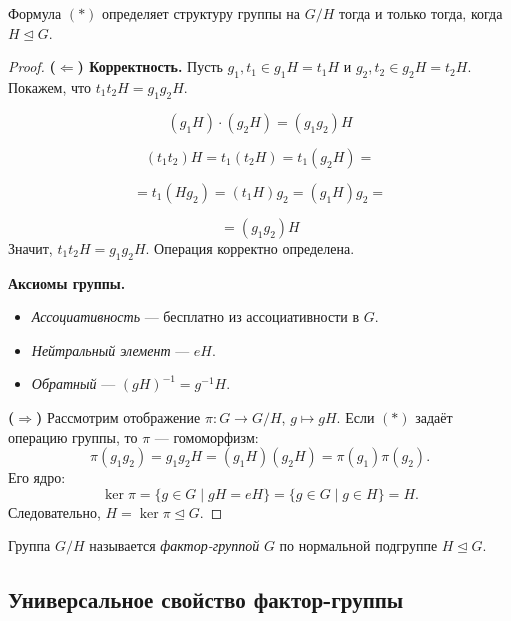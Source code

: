 \begin{stmt}
    Формула $(*)$ определяет структуру группы на $G/H$ тогда и только тогда, когда $H \trianglelefteq G$.

    \begin{proof}
        \textbf{($\Leftarrow$) Корректность.} Пусть $g_1, t_1 \in g_1 H = t_1 H$ и $g_2, t_2 \in g_2 H = t_2 H$. Покажем, что $t_1 t_2 H = g_1 g_2 H$.

        \[
        (g_1 H)\cdot(g_2 H) = (g_1 g_2)H
        \]

        \[
        (t_1 t_2)H = t_1(t_2 H) = t_1(g_2 H) =
        \]

        \[
        = t_1(H g_2) = (t_1 H) g_2 = (g_1 H) g_2 =
        \]

        \[
        = (g_1 g_2)H
        \]
        Значит, $t_1 t_2 H = g_1 g_2 H$. Операция корректно определена.

        \textbf{Аксиомы группы.}
        \begin{itemize}
            \item \emph{Ассоциативность} --- бесплатно из ассоциативности в $G$.
            \item \emph{Нейтральный элемент} --- $eH$.
            \item \emph{Обратный} --- $(gH)^{-1} = g^{-1}H$.
        \end{itemize}

        \textbf{($\Rightarrow$)} Рассмотрим отображение $\pi\colon G \to G/H$, $g \mapsto gH$. Если $(*)$ задаёт операцию группы, то $\pi$ --- гомоморфизм:
        \[
            \pi(g_1 g_2) = g_1 g_2 H = (g_1 H)(g_2 H) = \pi(g_1)\pi(g_2).
        \]
        Его ядро:
        \[
            \ker \pi = \{g \in G \mid gH = eH\} = \{g \in G \mid g \in H\} = H.
        \]
        Следовательно, $H = \ker \pi \trianglelefteq G$.
    \end{proof}
\end{stmt}

\begin{definition}
    Группа $G/H$ называется \emph{фактор-группой} $G$ по нормальной подгруппе $H \trianglelefteq G$.
\end{definition}

\subsection*{Универсальное свойство фактор-группы}

